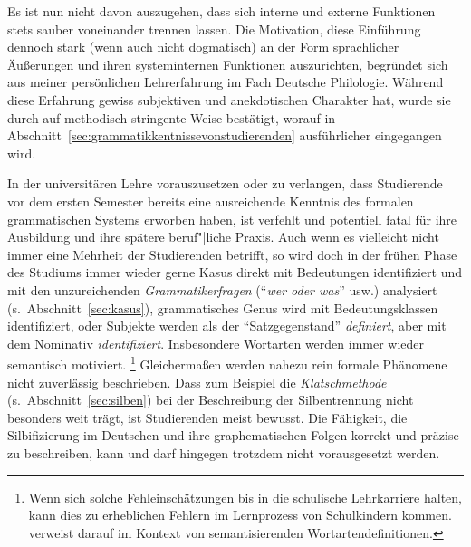 
Es ist nun nicht davon auszugehen, dass sich interne und externe Funktionen stets sauber voneinander trennen lassen.
Die Motivation, diese Einführung dennoch stark (wenn auch nicht dogmatisch) an der Form sprachlicher Äußerungen und ihren systeminternen Funktionen auszurichten, begründet sich aus meiner persönlichen Lehrerfahrung im Fach Deutsche Philologie.
Während diese Erfahrung gewiss subjektiven und anekdotischen Charakter hat, wurde sie durch \citet{SchaeferSayatz2017a} auf methodisch stringente Weise bestätigt, worauf in Abschnitt~\ref{sec:grammatikkentnissevonstudierenden} ausführlicher eingegangen wird.

In der universitären Lehre vorauszusetzen oder zu verlangen, dass Studierende vor dem ersten Semester bereits eine ausreichende Kenntnis des formalen grammatischen Systems erworben haben, ist verfehlt und potentiell fatal für ihre Ausbildung und ihre spätere beruf"|liche Praxis.
Auch wenn es vielleicht nicht immer eine Mehrheit der Studierenden betrifft, so wird doch in der frühen Phase des Studiums immer wieder gerne Kasus direkt mit Bedeutungen identifiziert und mit den unzureichenden \textit{Grammatikerfragen} ("`\textit{wer oder was}"' usw.) analysiert (s.\ Abschnitt~\ref{sec:kasus}), grammatisches Genus wird mit Bedeutungsklassen identifiziert, oder Subjekte werden als der "`Satzgegenstand"' \textit{definiert}, aber mit dem Nominativ \textit{identifiziert}.
Insbesondere Wortarten werden immer wieder semantisch motiviert.%
\footnote{Wenn sich solche Fehleinschätzungen bis in die schulische Lehrkarriere halten, kann dies zu erheblichen Fehlern im Lernprozess von Schulkindern kommen.
\citet[178--179]{Bredel2013} verweist darauf im Kontext von semantisierenden Wortartendefinitionen.}
Gleichermaßen werden nahezu rein formale Phänomene nicht zuverlässig beschrieben.
Dass zum Beispiel die \textit{Klatschmethode} (s.\ Abschnitt~\ref{sec:silben}) bei der Beschreibung der Silbentrennung nicht besonders weit trägt, ist Studierenden meist bewusst.
Die Fähigkeit, die Silbifizierung im Deutschen und ihre graphematischen Folgen korrekt und präzise zu beschreiben, kann und darf hingegen trotzdem nicht vorausgesetzt werden.

